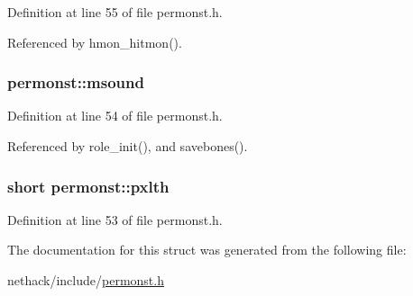 Definition at line 55 of file permonst.\+h.



Referenced by hmon\+\_\+hitmon().

\hypertarget{structpermonst_a8f9cc062b40fa92ce38e504987326190}{
\subsubsection[{msound}]{ permonst\+::msound}}\label{structpermonst_a8f9cc062b40fa92ce38e504987326190}


Definition at line 54 of file permonst.\+h.



Referenced by role\+\_\+init(), and savebones().

\hypertarget{structpermonst_ac6628ec4e0329495573f800c2107e0e3}{
\subsubsection[{pxlth}]{\setlength{\rightskip}{0pt plus 5cm}short permonst\+::pxlth}}\label{structpermonst_ac6628ec4e0329495573f800c2107e0e3}


Definition at line 53 of file permonst.\+h.



The documentation for this struct was generated from the following file\+:\begin{DoxyCompactItemize}
\item 
nethack/include/\hyperlink{permonst_8h}{permonst.\+h}\end{DoxyCompactItemize}
